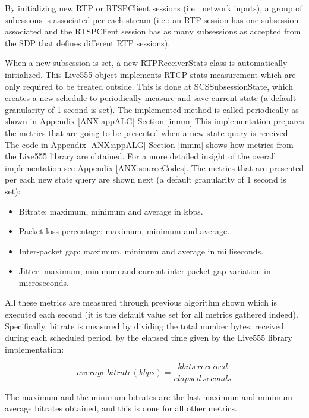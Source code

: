 By initializing new RTP or RTSPClient sessions (i.e.: network inputs), a group of subessions is associated per each stream (i.e.: an RTP session has one subsession associated and the RTSPClient session has as many subsessions as accepted from the SDP that defines different RTP sessions).

When a new subsession is set, a new RTPReceiverStats class is automatically initialized. This Live555 object implements RTCP stats measurement which are only required to be treated outside. This is done at SCSSubsessionState, which creates a new schedule to periodically measure and save current state (a default granularity of 1 second is set). The implemented method is called periodically as shown in Appendix \ref{ANX:appALG} Section \ref{inmm} This implementation prepares the metrics that are going to be presented when a new state query is received. The code in Appendix \ref{ANX:appALG} Section \ref{inmm} shows how metrics from the Live555 library are obtained. For a more detailed insight of the overall implementation see Appendix \ref{ANX:sourceCodes}. The metrics that are presented per each new state query are shown next (a default granularity of 1 second is set):

\begin{itemize}
\item Bitrate: maximum, minimum and average in kbps.
\item Packet loss percentage: maximum, minimum and average.
\item Inter-packet gap: maximum, minimum and average in milliseconds.
\item Jitter: maximum, minimum and current inter-packet gap variation in microseconds.
\end{itemize}

All these metrics are measured through previous algorithm shown which is executed each second (it is the default value set for all metrics gathered indeed). Specifically, bitrate is measured by dividing the total number bytes, received during each scheduled period, by the elapsed time given by the Live555 library implementation:

\begin{equation}\label{E:bitrate}
average\ bitrate (kbps) = \frac{kbits\ received}{elapsed\ seconds}
\end{equation}

The maximum and the minimum bitrates are the last maximum and minimum average bitrates obtained, and this is done for all other metrics.

